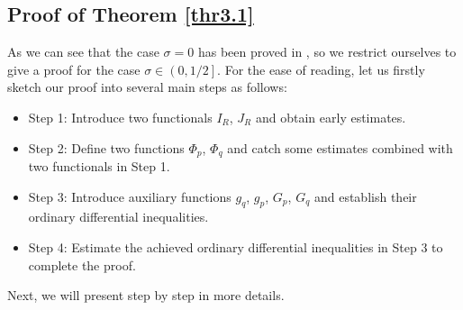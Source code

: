 \documentclass[11pt,reqno]{amsart}
\numberwithin{equation}{section}
\theoremstyle{plain}
\begin{document}
\subsection{Proof of Theorem \ref{thr3.1}}
As we can see that the case $\sigma=0$ has been proved in \cite{AnhRei2021}, so we restrict ourselves to give a proof for the case $\sigma\in \left(0,1/2\right]$. For the ease of reading, let us firstly sketch our proof into several main steps as follows:
\begin{itemize}
    \item Step 1: Introduce two functionals $I_{R}$, $J_{R}$ and obtain early estimates.
    \item Step 2: Define two functions $\Phi_p$, $\Phi_q$ and catch some estimates combined with two functionals in Step 1.
    \item Step 3: Introduce auxiliary functions $g_q$, $g_p$, $G_p$, $G_q$ and establish their ordinary differential inequalities.
    \item Step 4: Estimate the achieved ordinary differential inequalities in Step 3 to complete the proof.
\end{itemize}
Next, we will present step by step in more details. \medskip
\end{document}
